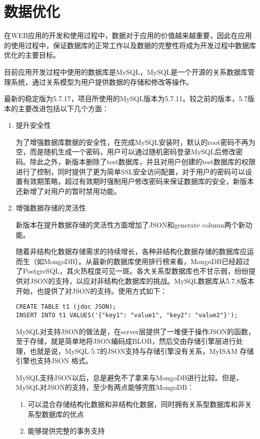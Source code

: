\chapter{数据优化}
\label{cha:Database}
在WEB应用的开发和使用过程中，数据对于应用的价值越来越重要，因此在应用的使用过程中，保证数据库的正常工作以及数据的完整性将成为开发过程中数据库优化的主要目标。

目前应用开发过程中使用的数据库是MySQL，MySQL是一个开源的关系数据库管理系统，通过关系模型为用户提供数据的存储和修改等操作。

最新的稳定版为5.7.17，项目所使用的MySQL版本为5.7.11。较之前的版本，5.7版本的主要改进包括以下几个方面：
\begin{enumerate}
    \item 提升安全性

    为了增强数据库数据的安全性，在完成MySQL安装时，默认的root密码不再为空，而是随机生成一个密码，用户可以通过随机密码登录MySQL后修改密码。除此之外，新版本删除了test数据库，并且对用户创建的test数据库的权限进行了控制，同时提供了更为简单SSL安全访问配置，对于用户的密码可以设置有效期策略，超过有效期时强制用户修改密码来保证数据库的安全，新版本还新增了对用户的暂时禁用功能。
    \item 增强数据存储的灵活性

    新版本在提升数据存储的灵活性方面增加了JSON和generate column两个新功能。

    随着非结构化数据存储需求的持续增长，各种非结构化数据存储的数据库应运而生（如MongoDB）。从最新的数据库使用排行榜来看，MongoDB已经超过了PostgreSQL，其火热程度可见一斑。各大关系型数据库也不甘示弱，纷纷提供对JSON的支持，以应对非结构化数据库的挑战。MySQL数据库从5.7.8版本开始，也提供了对JSON的支持。使用方式如下：
\begin{lstlisting}[numbers=none]
CREATE TABLE t1 (jdoc JSON);
INSERT INTO t1 VALUES('{"key1": "value1", "key2": "value2"}');
\end{lstlisting}
MySQL对支持JSON的做法是，在server层提供了一堆便于操作JSON的函数，至于存储，就是简单地将JSON编码成BLOB，然后交由存储引擎层进行处理，也就是说，MySQL 5.7的JSON支持与存储引擎没有关系，MyISAM 存储引擎也支持JSON 格式。

MySQL支持JSON以后，总是避免不了拿来与MongoDB进行比较。但是，MySQL对JSON的支持，至少有两点能够完胜MongoDB：
\begin{enumerate}
\item 可以混合存储结构化数据和非结构化数据，同时拥有关系型数据库和非关系型数据库的优点
\item 能够提供完整的事务支持
\end{enumerate}


\end{enumerate}
